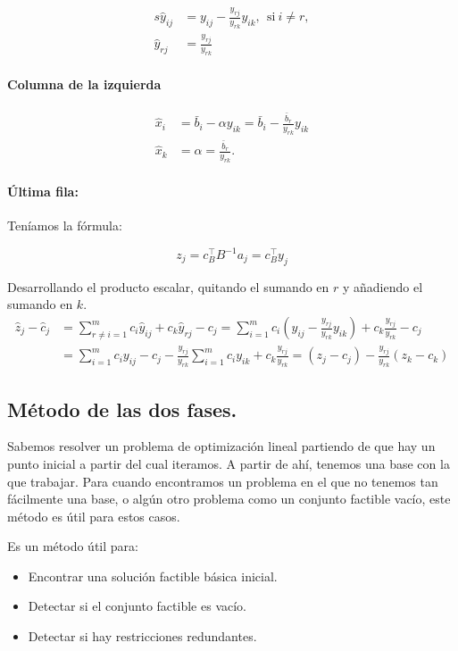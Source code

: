 \begin{align*}
s 
\hat{y}_{ij} &= y_{ij} - \frac{y_{rj}}{y_{rk}}y_{ik}, \ \ \mbox{si}\ i\neq r, \\
\hat{y}_{rj} &= \frac{y_{rj}}{y_{rk}}
\end{align*} 

\paragraph{Columna de la izquierda}

\begin{align*}
\hat{x}_i &= \bar{b}_i - \alpha y_{ik} = \bar{b}_i - \frac{\bar{b}_r}{y_{rk}} y_{ik}\\
\hat{x}_k &= \alpha = \frac{\bar{b}_r}{y_{rk}}.
\end{align*}

\paragraph{Última fila:}
Teníamos la fórmula:

\[z_j = c^\top_B B^{-1}a_j = c_B^\top y_j\]

Desarrollando el producto escalar, quitando el sumando en $r$ y añadiendo el sumando en $k$.
\begin{align*}
\hat{z}_j - \hat{c}_j &= \sum_{r\neq i=1}^m c_i \hat{y}_{ij} + c_k\hat{y}_{rj} - c_j=
\sum_{i=1}^m c_i \left(y_{ij} - \frac{y_{rj}}{y_{rk}}y_{ik}\right) + c_k\frac{y_{rj}}{y_{rk}} - c_j \\
&= \sum_{i=1}^m c_i y_{ij} - c_j -  \frac{y_{rj}}{y_{rk}} \sum_{i=1}^m c_i y_{ik} + c_k\frac{y_{rj}}{y_{rk}} = (z_j-c_j) - \frac{y_{rj}}{y_{rk}} (z_k-c_k)
\end{align*}


\subsection{Método de las dos fases.}

Sabemos resolver un problema de optimización lineal partiendo de que hay un punto inicial a partir del cual iteramos. 
A partir de ahí, tenemos una base con la que trabajar. 
Para cuando encontramos un problema en el que no tenemos tan fácilmente una base, o algún otro problema como un conjunto factible vacío, este método es útil para estos casos.


Es un método útil para:

\begin{itemize}
\item Encontrar una solución factible básica inicial.

\item Detectar si el conjunto factible es  vacío.

\item Detectar si hay restricciones redundantes.
\end{itemize}


